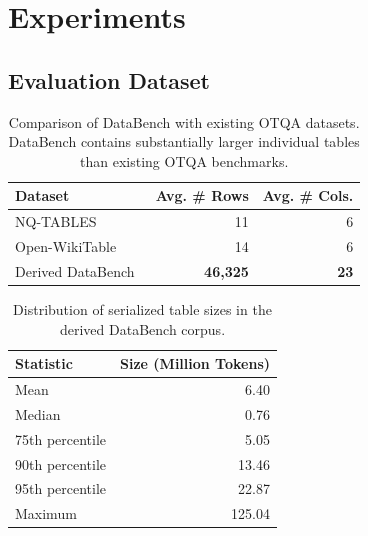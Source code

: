 \chapter{Experiments}

\section{Evaluation Dataset}

\begin{table}[t]
\centering
\caption{Comparison of DataBench with existing OTQA datasets.
DataBench contains substantially larger individual tables than existing OTQA benchmarks.}
\label{tab:dataset_comparison}
\begin{tabular}{lrr}
\toprule
\textbf{Dataset} & 
\textbf{Avg. \# Rows} &
\textbf{Avg. \# Cols.} \\
\midrule
NQ-TABLES \cite{nqtables} %
    & 11 & 6 \\
Open-WikiTable \cite{openwikitable} %
    & 14 & 6 \\
\midrule
Derived DataBench~\cite{databench} &  \textbf{46,325} & \textbf{23} \\
\bottomrule
\end{tabular}
\end{table}
\begin{table}[t]
\centering
\caption{Distribution of serialized table sizes in the derived DataBench corpus.}
\label{tab:databench_table_size}
\begin{tabular}{lr}
\toprule
\textbf{Statistic} & \textbf{Size (Million Tokens)} \\
\midrule
Mean            & 6.40 \\
Median          & 0.76 \\
75th percentile & 5.05 \\
90th percentile & 13.46 \\
95th percentile & 22.87 \\
Maximum         & 125.04 \\
\bottomrule
\end{tabular}
\end{table}

